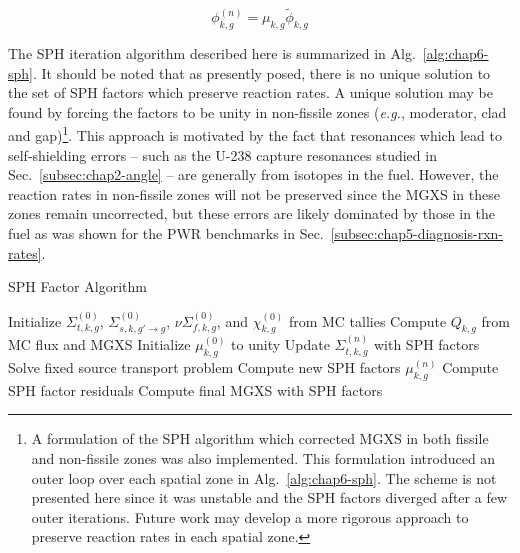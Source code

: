 \begin{dmath}
\label{eqn:chap6-sph-update-scalar-flux}
\phi_{k,g}^{(n)} = \mu_{k,g}\tilde{\phi}_{k,g}
\end{dmath}

The SPH iteration algorithm described here is summarized in Alg.~\ref{alg:chap6-sph}. It should be noted that as presently posed, there is no unique solution to the set of SPH factors which preserve reaction rates. A unique solution may be found by forcing the factors to be unity in non-fissile zones (\textit{e.g.}, moderator, clad and gap)\footnote{A formulation of the SPH algorithm which corrected MGXS in both fissile and non-fissile zones was also implemented. This formulation introduced an outer loop over each spatial zone in Alg.~\ref{alg:chap6-sph}. The scheme is not presented here since it was unstable and the SPH factors diverged after a few outer iterations. Future work may develop a more rigorous approach to preserve reaction rates in each spatial zone.}. This approach is motivated by the fact that resonances which lead to self-shielding errors -- such as the U-238 capture resonances studied in Sec.~\ref{subsec:chap2-angle} -- are generally from isotopes in the fuel. However, the reaction rates in non-fissile zones will not be preserved since the MGXS in these zones remain uncorrected, but these errors are likely dominated by those in the fuel as was shown for the PWR benchmarks in Sec.~\ref{subsec:chap5-diagnosis-rxn-rates}.

\begin{algorithm}[h]
\caption{SPH Factor Algorithm}
\label{alg:chap6-sph}
\begin{algorithmic}[1]
  \State Initialize $\Sigma_{t,k,g}^{(0)}$, $\Sigma_{s,k,g'\rightarrow g}^{(0)}$, $\nu\Sigma_{f,k,g}^{(0)}$, and $\chi_{k,g}^{(0)}$ from MC tallies 
  \State Compute $Q_{k,g}$ from MC flux and MGXS 
  \State Initialize $\mu_{k,g}^{(0)}$ to unity
    \State Update $\Sigma_{t,k,g}^{(n)}$ with SPH factors 
    \State Solve fixed source transport problem\footnotemark {}
    \State Compute new SPH factors $\mu_{k,g}^{(n)}$ 
    \State Compute SPH factor residuals 
  \EndWhile
  \State Compute final MGXS with SPH factors 
\end{algorithmic}
\end{algorithm}

